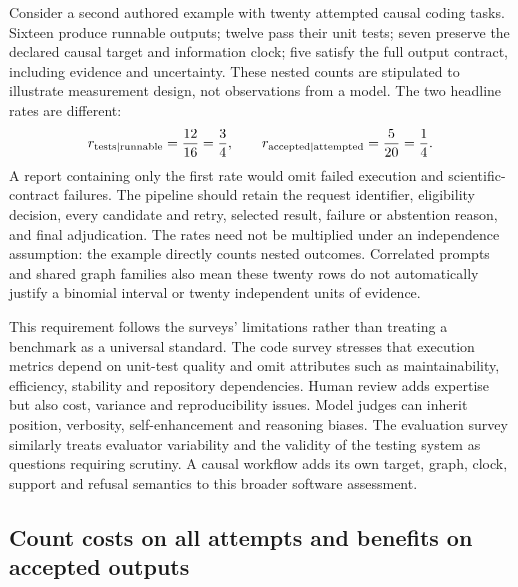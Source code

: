 Consider a second authored example with twenty attempted causal coding tasks.
Sixteen produce runnable outputs; twelve pass their unit tests; seven preserve
the declared causal target and information clock; five satisfy the full output
contract, including evidence and uncertainty. These nested counts are stipulated
to illustrate measurement design, not observations from a model. The two
headline rates are different:
\begin{equation}
 r_{\rm tests\mid runnable}=\frac{12}{16}=\frac34,
 \qquad
 r_{\rm accepted\mid attempted}=\frac5{20}=\frac14.
 \label{exec19:evalcode-denominators}
\end{equation}
A report containing only the first rate would omit failed execution and
scientific-contract failures. The pipeline should retain the request identifier,
eligibility decision, every candidate and retry, selected result, failure or
abstention reason, and final adjudication. The rates need not be multiplied
under an independence assumption: the example directly counts nested outcomes.
Correlated prompts and shared graph families also mean these twenty rows do
not automatically justify a binomial interval or twenty independent units of
evidence.\citep{exec19_surveys_reference}

This requirement follows the surveys' limitations rather than treating a
benchmark as a universal standard. The code survey stresses that execution
metrics depend on unit-test quality and omit attributes such as maintainability,
efficiency, stability and repository dependencies. Human review adds expertise
but also cost, variance and reproducibility issues. Model judges can inherit
position, verbosity, self-enhancement and reasoning biases. The evaluation
survey similarly treats evaluator variability and the validity of the testing
system as questions requiring scrutiny. A causal workflow adds its own
target, graph, clock, support and refusal semantics to this broader software
assessment.\citep{exec19_surveys_code,exec19_surveys_evaluation}

\subsection{Count costs on all attempts and benefits on accepted outputs}
\label{exec19:evalcode-cost}

